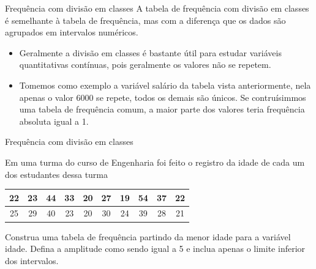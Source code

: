 \begin{frame}{Frequência  com divisão em classes}
    A tabela de frequência  com divisão em classes é semelhante à tabela de frequência, mas com a 
    diferença que os dados são agrupados em intervalos numéricos. 
    \pause
\begin{itemize}
    \item  Geralmente a divisão em classes é bastante útil para estudar variáveis quantitativas contínuas, pois geralmente os valores não se repetem.
    \item  Tomemos como exemplo a variável salário da tabela vista anteriormente, nela apenas o valor 6000 se repete, todos os demais são únicos. Se contruísimmos uma tabela de frequência comum, a maior parte dos valores teria frequência absoluta igual a 1.
\end{itemize}
   
\end{frame}

\begin{frame}{Frequência com divisão em classes}
    \begin{exemplo}
         Em uma turma do curso de Engenharia foi feito o registro da idade de cada um dos estudantes dessa turma
        \begin{table}[G]
         \begin{tabular}{|c|c|c|c|c|c|c|c|c|c|}
            \hline
            22 & 23 & 44 & 33 & 20 & 27 & 19 & 54 & 37 & 22 \\ \hline
            25 & 29 & 40 & 23 & 20 & 30 & 24 & 39 & 28 & 21 \\ \hline
            \end{tabular}
        \end{table}

            Construa uma tabela de frequência partindo da menor idade para a variável idade. Defina a amplitude como sendo igual a 5 e inclua apenas o limite inferior dos intervalos.
    \end{exemplo}

\pause
\end{frame}

